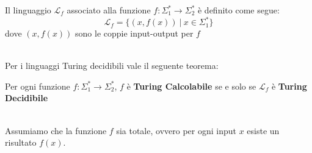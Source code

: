 \colorbox{SALZO}{\parbox{\dimexpr\linewidth-2\fboxsep}{\begin{definition}
   Il linguaggio $\mathcal{L}_f$ associato alla funzione $f: \Sigma_1^* \to \Sigma_2^*$ è definito come segue:
   \[     \mathcal{L}_f  = \big\{ (x,f(x)) \ | \ x \in \Sigma_1^*  \big\} \]
   dove $(x,f(x))$ sono le coppie input-output per $f$
\end{definition}}}\smallskip\\
Per i linguaggi Turing decidibili vale il seguente teorema:\smallskip\\
\colorbox{SALZO}{\parbox{\dimexpr\linewidth-2\fboxsep}{\begin{theorem}
   Per ogni funzione $f: \Sigma_1^* \to \Sigma_2^*$, $f$ è \textbf{Turing Calcolabile} se e solo se $\mathcal{L}_f$ è \textbf{Turing Decidibile}
\end{theorem}}}\smallskip\\
Assumiamo che la funzione $f$ sia totale, ovvero per ogni input $x$ esiste un risultato $f(x)$.

